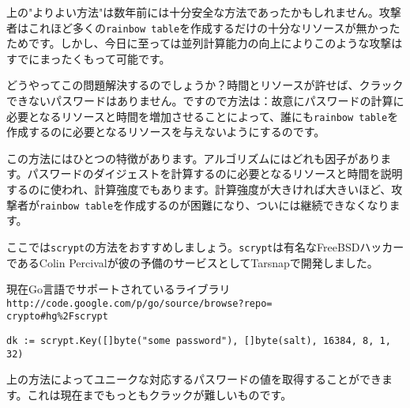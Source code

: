 上の"よりよい方法"は数年前には十分安全な方法であったかもしれません。攻撃者はこれほど多くの\texttt{rainbow table}を作成するだけの十分なリソースが無かったためです。しかし、今日に至っては並列計算能力の向上によりこのような攻撃はすでにまったくもって可能です。

どうやってこの問題解決するのでしょうか？時間とリソースが許せば、クラックできないパスワードはありません。ですので方法は：故意にパスワードの計算に必要となるリソースと時間を増加させることによって、誰にも\texttt{rainbow table}を作成するのに必要となるリソースを与えないようにするのです。

この方法にはひとつの特徴があります。アルゴリズムにはどれも因子があります。パスワードのダイジェストを計算するのに必要となるリソースと時間を説明するのに使われ、計算強度でもあります。計算強度が大きければ大きいほど、攻撃者が\texttt{rainbow table}を作成するのが困難になり、ついには継続できなくなります。

ここでは\texttt{scrypt}の方法をおすすめしましょう。\texttt{scrypt}は有名なFreeBSDハッカーであるColin Percivalが彼の予備のサービスとしてTarsnapで開発しました。

現在Go言語でサポートされているライブラリ\texttt{http://code.google.com/p/go/source/browse?repo=\\crypto\#hg\%2Fscrypt}

\begin{lstlisting}[numbers=none]
dk := scrypt.Key([]byte("some password"), []byte(salt), 16384, 8, 1, 32)
\end{lstlisting}

上の方法によってユニークな対応するパスワードの値を取得することができます。これは現在までもっともクラックが難しいものです。

